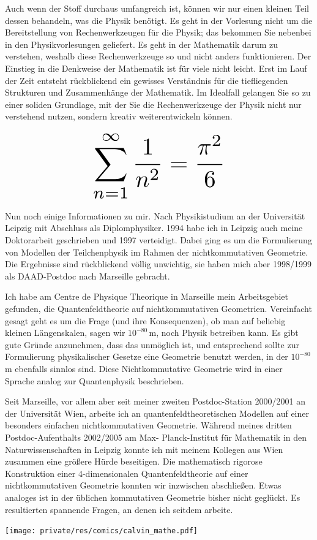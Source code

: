 \begin{multicols}{2}
Auch wenn der Stoff durchaus umfangreich ist, können wir nur einen kleinen Teil dessen behandeln, was die Physik benötigt. Es geht in der Vorlesung nicht um die Bereitstellung von Rechenwerkzeugen für die Physik; das bekommen Sie nebenbei in den Physikvorlesungen geliefert. Es geht in der Mathematik darum zu verstehen, weshalb diese Rechenwerkzeuge so und nicht anders funktionieren. Der Einstieg in die Denkweise der Mathematik ist für viele nicht leicht. Erst im Lauf der Zeit entsteht rückblickend ein gewisses Verständnis für die tiefliegenden Strukturen und Zusammenhänge der Mathematik. Im Idealfall gelangen Sie so zu einer soliden Grundlage, mit der Sie die Rechenwerkzeuge der Physik nicht nur verstehend nutzen, sondern kreativ weiterentwickeln können.


\[
\resizebox{0.45\hsize}{!}{$\displaystyle\sum_{n = 1}^\infty \frac{1}{n^2} = \frac{\pi^2}{6}$}
\]

Nun noch einige Informationen zu mir. Nach Physikistudium an der Universität Leipzig mit Abschluss als Diplomphysiker. 1994 habe ich in Leipzig auch meine Doktorarbeit geschrieben und 1997 verteidigt. Dabei ging es um die Formulierung von Modellen der Teilchenphysik im Rahmen der nichtkommutativen Geometrie. Die Ergebnisse sind rückblickend völlig unwichtig, sie haben mich aber 1998/1999 als DAAD-Postdoc nach Marseille gebracht.

Ich habe am Centre de Physique Theorique in Marseille mein Arbeitsgebiet gefunden, die Quantenfeldtheorie auf nichtkommutativen Geometrien. Vereinfacht gesagt geht es um die Frage (und ihre Konsequenzen), ob man auf beliebig kleinen Längenskalen, sagen wir $10^{-80}$\,m, noch Physik betreiben kann. Es gibt gute Gründe anzunehmen, dass das unmöglich ist, und entsprechend sollte zur Formulierung physikalischer Gesetze eine Geometrie benutzt werden, in der $10^{-80}$\,m ebenfalls sinnlos sind. Diese Nichtkommutative Geometrie wird in einer Sprache analog zur Quantenphysik beschrieben.

Seit Marseille, vor allem aber seit meiner zweiten Postdoc-Station 2000/2001 an der Universität Wien, arbeite ich an quantenfeldtheoretischen Modellen auf einer besonders einfachen nichtkommutativen Geometrie. Während meines dritten Postdoc-Aufenthalts 2002/2005 am Max- Planck-Institut für Mathematik in den Naturwissenschaften in Leipzig konnte ich mit meinem Kollegen aus Wien zusammen eine größere Hürde beseitigen. Die mathematisch rigorose Konstruktion einer 4-dimensionalen Quantenfeldtheorie auf einer nichtkommutativen Geometrie konnten wir inzwischen abschließen. Etwas analoges ist in der üblichen kommutativen Geometrie bisher nicht geglückt. Es resultierten spannende Fragen, an denen ich seitdem arbeite.

\begin{center}
\texttt{[image: private/res/comics/calvin\_mathe.pdf]}
\end{center}
\end{multicols}
